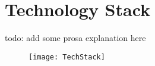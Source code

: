 \section{Technology Stack}

todo: add some prosa explanation here


\begin{figure}[hbt!]
    \texttt{[image: TechStack]}
\end{figure}

